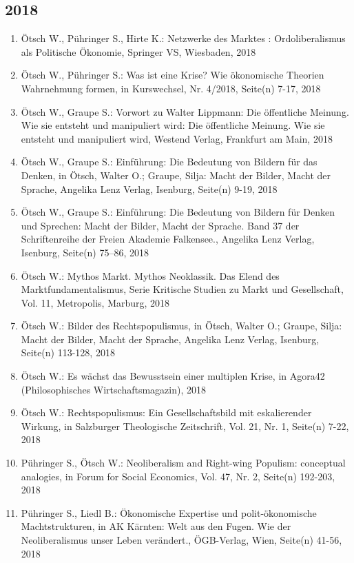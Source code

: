 \subsection*{2018}
\begin{enumerate}
    	 \item Ötsch W., Pühringer S., Hirte K.: Netzwerke des Marktes : Ordoliberalismus als Politische Ökonomie, Springer VS, Wiesbaden, 2018
	 \item Ötsch W., Pühringer S.: Was ist eine Krise? Wie ökonomische Theorien Wahrnehmung formen, in Kurswechsel, Nr. 4/2018, Seite(n) 7-17, 2018
	 \item Ötsch W., Graupe S.: Vorwort zu Walter Lippmann: Die öffentliche Meinung. Wie sie entsteht und manipuliert wird: Die öffentliche Meinung. Wie sie entsteht und manipuliert wird, Westend Verlag, Frankfurt am Main, 2018
	 \item Ötsch W., Graupe S.: Einführung: Die Bedeutung von Bildern für das Denken, in Ötsch, Walter O.; Graupe, Silja: Macht der Bilder, Macht der Sprache, Angelika Lenz Verlag, Isenburg, Seite(n) 9-19, 2018
	 \item Ötsch W., Graupe S.: Einführung: Die Bedeutung von Bildern für Denken und Sprechen: Macht der Bilder, Macht der Sprache. Band 37 der Schriftenreihe der Freien Akademie Falkensee., Angelika Lenz Verlag, Isenburg, Seite(n) 75–86, 2018
	 \item Ötsch W.: Mythos Markt. Mythos Neoklassik. Das Elend des Marktfundamentalismus, Serie Kritische Studien zu Markt und Gesellschaft, Vol. 11, Metropolis, Marburg, 2018
	 \item Ötsch W.: Bilder des Rechtspopulismus, in Ötsch, Walter O.; Graupe, Silja: Macht der Bilder, Macht der Sprache, Angelika Lenz Verlag, Isenburg, Seite(n) 113-128, 2018
	 \item Ötsch W.: Es wächst das Bewusstsein einer multiplen Krise, in Agora42 (Philosophisches Wirtschaftsmagazin), 2018
	 \item Ötsch W.: Rechtspopulismus: Ein Gesellschaftsbild mit eskalierender Wirkung, in Salzburger Theologische Zeitschrift, Vol. 21, Nr. 1, Seite(n) 7-22, 2018
	 \item Pühringer S., Ötsch W.: Neoliberalism and Right-wing Populism: conceptual analogies, in Forum for Social Economics, Vol. 47, Nr. 2, Seite(n) 192-203, 2018
	 \item Pühringer S., Liedl B.: Ökonomische Expertise und polit-ökonomische Machtstrukturen, in AK Kärnten: Welt aus den Fugen. Wie der Neoliberalismus unser Leben verändert., ÖGB-Verlag, Wien, Seite(n) 41-56, 2018

\end{enumerate}
